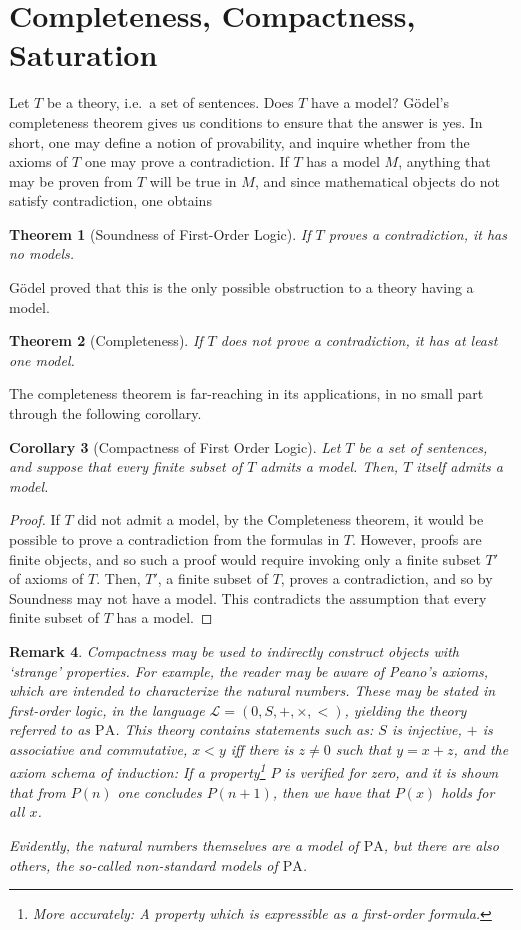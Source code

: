 \documentclass{article}
\newtheorem{theorem}{Theorem}[section]
\newtheorem{corollary}[theorem]{Corollary}
\newtheorem{remark}[theorem]{Remark}
\theoremstyle{nonumberplain}
\newtheorem{proof}{Proof}
\newcommand{\Lang}{\mathcal{L}}
\begin{document}
\section{Completeness, Compactness, Saturation}

Let $T$ be a theory, i.e.\ a set of sentences. Does $T$ have a model? Gödel's completeness theorem gives us conditions to ensure that the answer is yes. In short, one may define a notion of provability, and inquire whether from the axioms of $T$ one may prove a contradiction. If $T$ has a model $M$, anything that may be proven from $T$ will be true in $M$, and since mathematical objects do not satisfy contradiction, one obtains
\begin{theorem}[Soundness of First-Order Logic]
If $T$ proves a contradiction, it has no models.
\end{theorem}

Gödel proved that this is the only possible obstruction to a theory having a model.
\begin{theorem}[Completeness]
If $T$ does not prove a contradiction, it has at least one model.
\end{theorem}

The completeness theorem is far-reaching in its applications, in no small part through the following corollary.
\begin{corollary}[Compactness of First Order Logic]
Let $T$ be a set of sentences, and suppose that every finite subset of $T$ admits a model. Then, $T$ itself admits a model.
\end{corollary}

\begin{proof}
If $T$ did not admit a model, by the Completeness theorem, it would be possible to prove a contradiction from the formulas in $T$. However, proofs are finite objects, and so such a proof would require invoking only a finite subset $T'$ of axioms of $T$. Then, $T'$, a finite subset of $T$, proves a contradiction, and so by Soundness may not have a model. This contradicts the assumption that every finite subset of $T$ has a model.
\end{proof}

\begin{remark}\label{rmk:pa}
Compactness may be used to indirectly construct objects with `strange' properties. For example, the reader may be aware of Peano's axioms, which are intended to characterize the natural numbers. These may be stated in first-order logic, in the language $\Lang = (0,S,+,\times,<)$, yielding the theory referred to as $\mathrm{PA}$. This theory contains statements such as: $S$ is injective, $+$ is associative and commutative, $x<y$ iff there is $z\neq 0$ such that $y=x+z$, and the axiom schema of induction: If a property\footnote{More accurately: A property which is expressible as a first-order formula.} $P$ is verified for zero, and it is shown that from $P(n)$ one concludes $P(n+1)$, then we have that $P(x)$ holds for all $x$.

Evidently, the natural numbers themselves are a model of $\mathrm{PA}$, but there are also others, the so-called \emph{non-standard models} of $\mathrm{PA}$.
\end{remark}
\end{document}
